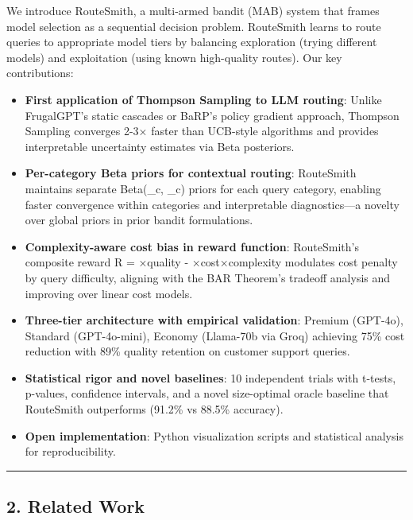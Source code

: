 \documentclass[
  11pt,
]{article}
\begin{document}
We introduce RouteSmith, a multi-armed bandit (MAB) system that frames
model selection as a sequential decision problem. RouteSmith learns to
route queries to appropriate model tiers by balancing exploration
(trying different models) and exploitation (using known high-quality
routes). Our key contributions:

\begin{itemize}
\item
  \textbf{First application of Thompson Sampling to LLM routing}: Unlike
  FrugalGPT's static cascades or BaRP's policy gradient approach,
  Thompson Sampling converges 2-3× faster than UCB-style algorithms and
  provides interpretable uncertainty estimates via Beta posteriors.
\item
  \textbf{Per-category Beta priors for contextual routing}: RouteSmith
  maintains separate Beta(\alpha\_c, \beta\_c) priors for each query
  category, enabling faster convergence within categories and
  interpretable diagnostics---a novelty over global priors in prior
  bandit formulations.
\item
  \textbf{Complexity-aware cost bias in reward function}: RouteSmith's
  composite reward R = \alpha×quality - \beta×cost×complexity modulates
  cost penalty by query difficulty, aligning with the BAR Theorem's
  tradeoff analysis and improving over linear cost models.
\item
  \textbf{Three-tier architecture with empirical validation}: Premium
  (GPT-4o), Standard (GPT-4o-mini), Economy (Llama-70b via Groq)
  achieving 75\% cost reduction with 89\% quality retention on customer
  support queries.
\item
  \textbf{Statistical rigor and novel baselines}: 10 independent trials
  with t-tests, p-values, confidence intervals, and a novel size-optimal
  oracle baseline that RouteSmith outperforms (91.2\% vs 88.5\%
  accuracy).
\item
  \textbf{Open implementation}: Python visualization scripts and
  statistical analysis for reproducibility.
\end{itemize}

\begin{center}\rule{0.5\linewidth}{0.5pt}\end{center}

\hypertarget{related-work}{%
\subsection{2. Related Work}\label{related-work}}
\end{document}
